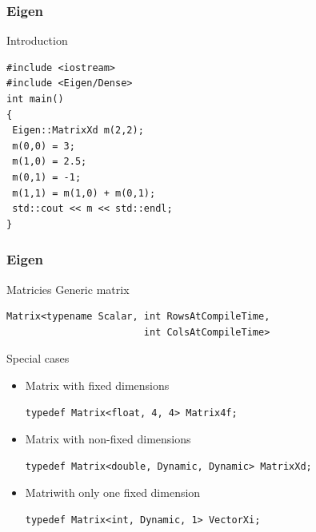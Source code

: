 \documentclass{beamer}
\begin{document}

\begin{frame}[fragile]

    \frametitle{Eigen}

    \begin{block}{Introduction}
        \begin{lstlisting}
#include <iostream>
#include <Eigen/Dense>
int main()
{
 Eigen::MatrixXd m(2,2);
 m(0,0) = 3;
 m(1,0) = 2.5;
 m(0,1) = -1;
 m(1,1) = m(1,0) + m(0,1);
 std::cout << m << std::endl;
}
        \end{lstlisting}
    \end{block}

\end{frame}


\begin{frame}[fragile]

    \frametitle{Eigen}

        \begin{block}{Matricies}
            Generic matrix
            \begin{lstlisting}
Matrix<typename Scalar, int RowsAtCompileTime,
                        int ColsAtCompileTime>
            \end{lstlisting}
        \end{block}

        \begin{block}{Special cases}
            \begin{itemize}
                \item Matrix with fixed dimensions
                    \begin{lstlisting}
typedef Matrix<float, 4, 4> Matrix4f;
                    \end{lstlisting}
                \item Matrix with non-fixed dimensions
                    \begin{lstlisting}
typedef Matrix<double, Dynamic, Dynamic> MatrixXd;
                    \end{lstlisting}
                \item Matriwith only one fixed dimension
                    \begin{lstlisting}
typedef Matrix<int, Dynamic, 1> VectorXi;
                    \end{lstlisting}
            \end{itemize}
        \end{block}

\end{frame}
\end{document}
